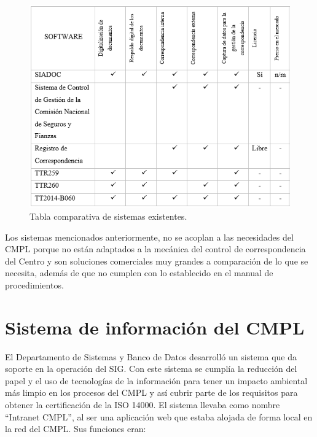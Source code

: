 	\begin{figure}[htbp!]
		\centering
			\includegraphics[width=.8\textwidth]{images/antecedentes/ComparativaEA}
		\caption{Tabla comparativa de sistemas existentes.}
		\label{fig:Sistemas existentes}
	\end{figure}
	

Los sistemas mencionados anteriormente, no se acoplan a las necesidades del CMPL porque no están adaptados a la mecánica del control de correspondencia del Centro y son soluciones comerciales muy grandes a comparación de lo que se necesita, además de que no cumplen con lo establecido en el manual de procedimientos. \\

	
	\section{Sistema de información del CMPL}
	El Departamento de Sistemas y Banco de Datos desarrolló un sistema que da soporte en la operación del SIG. Con este sistema se cumplía la reducción del papel y el uso de tecnologías de la información para tener un impacto ambiental más limpio en los procesos del CMPL  y así cubrir parte de los requisitos para obtener la certificación de la ISO 14000. El sistema llevaba como nombre ``Intranet CMPL'', al ser una aplicación web que estaba alojada de forma local en la red del CMPL. Sus funciones eran:\\
	
